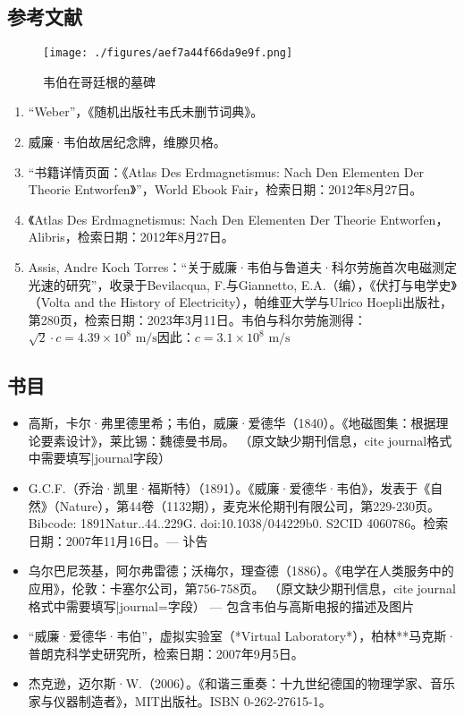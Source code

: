 \subsection{参考文献}  
\begin{figure}[ht]
\centering
\texttt{[image: ./figures/aef7a44f66da9e9f.png]}
\caption{韦伯在哥廷根的墓碑} \label{fig_Eduard_5}
\end{figure}
\begin{enumerate}
\item “Weber”，《随机出版社韦氏未删节词典》。  
\item 威廉·韦伯故居纪念牌，维滕贝格。  
\item “书籍详情页面：《Atlas Des Erdmagnetismus: Nach Den Elementen Der Theorie Entworfen》”，World Ebook Fair，检索日期：2012年8月27日。  
\item 《Atlas Des Erdmagnetismus: Nach Den Elementen Der Theorie Entworfen，Alibris，检索日期：2012年8月27日。  
\item Assis, Andre Koch Torres：“关于威廉·韦伯与鲁道夫·科尔劳施首次电磁测定光速的研究”，收录于Bevilacqua, F.与Giannetto, E.A.（编），《伏打与电学史》（Volta and the History of Electricity），帕维亚大学与Ulrico Hoepli出版社，第280页，检索日期：2023年3月11日。韦伯与科尔劳施测得：\(\sqrt{2} \cdot c = 4.39 \times 10^8 \text{ m/s}\)因此：\(c = 3.1 \times 10^8 \text{ m/s}\)
\end{enumerate}
\subsection{书目}  
\begin{itemize}
\item 高斯，卡尔·弗里德里希；韦伯，威廉·爱德华（1840）。《地磁图集：根据理论要素设计》，莱比锡：魏德曼书局。  
   （原文缺少期刊信息，{{cite journal}}格式中需要填写|journal字段）  
\item G.C.F.（乔治·凯里·福斯特）（1891）。《威廉·爱德华·韦伯》，发表于《自然》（Nature），第44卷（1132期），麦克米伦期刊有限公司，第229-230页。  
   Bibcode: 1891Natur..44..229G. doi:10.1038/044229b0. S2CID 4060786。检索日期：2007年11月16日。— 讣告  
\item 乌尔巴尼茨基，阿尔弗雷德；沃梅尔，理查德（1886）。《电学在人类服务中的应用》，伦敦：卡塞尔公司，第756-758页。  
   （原文缺少期刊信息，{{cite journal}}格式中需要填写|journal=字段）  
   — 包含韦伯与高斯电报的描述及图片  
\item “威廉·爱德华·韦伯”，虚拟实验室（*Virtual Laboratory*），柏林**马克斯·普朗克科学史研究所，检索日期：2007年9月5日。  
\item 杰克逊，迈尔斯·W.（2006）。《和谐三重奏：十九世纪德国的物理学家、音乐家与仪器制造者》，MIT出版社。ISBN 0-262-27615-1。
\end{itemize}
